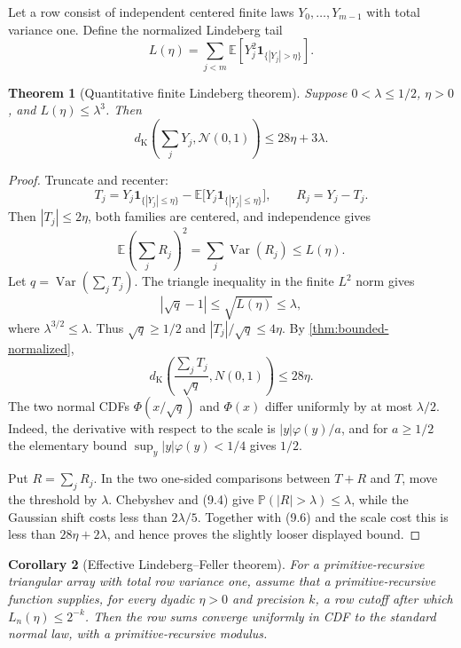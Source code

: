 \documentclass[11pt]{article}
\newtheorem{theorem}{Theorem}[section]
\newtheorem{corollary}[theorem]{Corollary}
\newcommand{\E}{\mathbb E}
\newcommand{\Pp}{\mathbb P}
\newcommand{\Var}{\operatorname{Var}}
\newcommand{\ind}{\mathbf 1}
\newcommand{\PhiN}{\Phi}
\newcommand{\phiN}{\varphi}
\newcommand{\dk}{d_{\mathrm K}}
\begin{document}
Let a row consist of independent centered finite laws \(Y_0,\ldots,Y_{m-1}\)
with total variance one.  Define the normalized Lindeberg tail
\[
 L(\eta)=\sum_{j<m}\E\!
   \left[Y_j^2\ind_{\{|Y_j|>\eta\}}\right].           \tag{9.1}
\]

\begin{theorem}[Quantitative finite Lindeberg theorem]
\label{thm:quant-lindeberg}
Suppose \(0<\lambda\le1/2\), \(\eta>0\), and
\(L(\eta)\le\lambda^3\).  Then
\[
 \dk\!\left(\sum_jY_j,\mathcal N(0,1)\right)
 \le 28\eta+3\lambda.                                \tag{9.2}
\]
\end{theorem}

\begin{proof}
Truncate and recenter:
\[
 T_j=Y_j\ind_{\{|Y_j|\le\eta\}}
       -\E\!\bigl[Y_j\ind_{\{|Y_j|\le\eta\}}\bigr],
 \qquad R_j=Y_j-T_j.                                  \tag{9.3}
\]
Then \(|T_j|\le2\eta\), both families are centered, and independence gives
\[
 \E\left(\sum_jR_j\right)^2
 =\sum_j\Var(R_j)\le L(\eta).                        \tag{9.4}
\]
Let \(q=\Var(\sum_jT_j)\).  The triangle inequality in the finite
\(L^2\) norm gives
\[
 |\sqrt q-1|\le\sqrt{L(\eta)}\le\lambda,             \tag{9.5}
\]
where \(\lambda^{3/2}\le\lambda\).  Thus \(\sqrt q\ge1/2\) and
\(|T_j|/\sqrt q\le4\eta\).  By \cref{thm:bounded-normalized},
\[
 \dk\!\left(\frac{\sum_jT_j}{\sqrt q},N(0,1)\right)
 \le28\eta.                                          \tag{9.6}
\]
The two normal CDFs \(\PhiN(x/\sqrt q)\) and \(\PhiN(x)\) differ uniformly
by at most \(\lambda/2\).  Indeed, the derivative with respect to the scale
is \(|y|\phiN(y)/a\), and for \(a\ge1/2\) the elementary bound
\(\sup_y|y|\phiN(y)<1/4\) gives \(1/2\).

Put \(R=\sum_jR_j\).  In the two one-sided comparisons between \(T+R\) and
\(T\), move the threshold by \(\lambda\).  Chebyshev and (9.4) give
\(\Pp(|R|>\lambda)\le\lambda\), while the Gaussian shift costs less than
\(2\lambda/5\).  Together with (9.6) and the scale cost this is less than
\(28\eta+2\lambda\), and hence proves the slightly looser displayed bound.
\end{proof}

\begin{corollary}[Effective Lindeberg--Feller theorem]
\label{cor:lindeberg}
For a primitive-recursive triangular array with total row variance one,
assume that a primitive-recursive function supplies, for every dyadic
\(\eta>0\) and precision \(k\), a row cutoff after which
\(L_n(\eta)\le2^{-k}\).  Then the row sums converge uniformly in CDF to the
standard normal law, with a primitive-recursive modulus.
\end{corollary}
\end{document}
